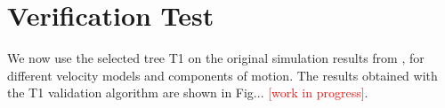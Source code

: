 
\section{Verification Test}

We now use the selected tree T1 on the original simulation results from \citet{Taborda_2014_BSSA}, for different velocity models and components of motion. The results obtained with the T1 validation algorithm are shown in Fig... \textcolor{red}{[work in progress]}.